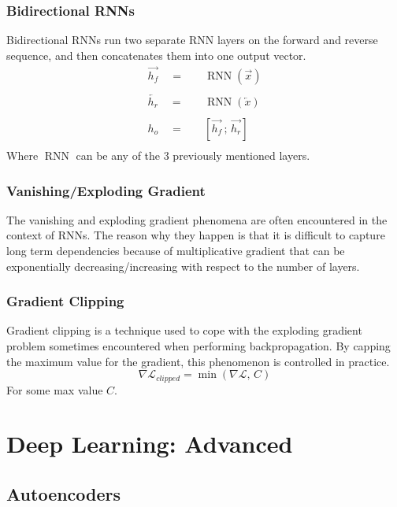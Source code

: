 \documentclass[twoside,twocolumn]{article}
\begin{document}
\subsubsection{Bidirectional RNNs}
Bidirectional RNNs run two separate RNN layers on the forward and reverse
sequence, and then concatenates them into one output vector.
\begin{equation}
  \begin{split}
    \overrightarrow{h_f} \quad =& \quad \operatorname{RNN}\left(\overrightarrow{x}\right) \\
    \\
    \overleftarrow{h_r} \quad =& \quad \operatorname{RNN}\left(\overleftarrow{x}\right) \\
    \\
    h_o \quad =& \quad \left[\overrightarrow{h_f} \,;\, \overrightarrow{h_r} \right] \\
  \end{split}
\end{equation}
Where $\operatorname{RNN}$ can be any of the 3 previously mentioned layers.
\subsubsection{Vanishing/Exploding Gradient}
The vanishing and exploding gradient phenomena are often encountered in the
context of RNNs. The reason why they happen is that it is difficult to
capture long term dependencies because of multiplicative gradient that can
be exponentially decreasing/increasing with respect to the number of layers.
\subsubsection{Gradient Clipping}
Gradient clipping is a technique used to cope with the exploding gradient
problem sometimes encountered when performing backpropagation.
By capping the maximum value for the gradient, this phenomenon is
controlled in practice.
\begin{equation}
  \nabla \mathcal{L}_{clipped} = \min \left( \nabla \mathcal{L}, \, C  \right)
\end{equation}
For some max value $C$.
\section{Deep Learning: Advanced}
\subsection{Autoencoders}
\end{document}
